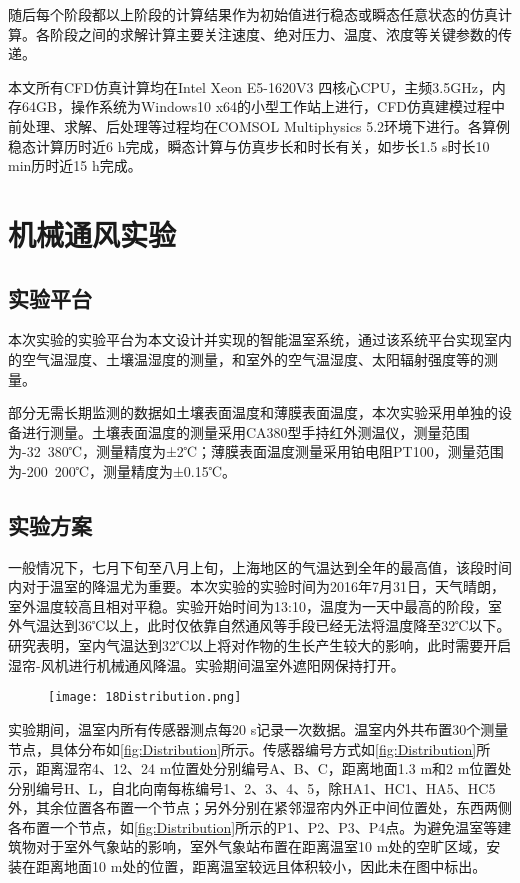 随后每个阶段都以上阶段的计算结果作为初始值进行稳态或瞬态任意状态的仿真计算。各阶段之间的求解计算主要关注速度、绝对压力、温度、浓度等关键参数的传递。

本文所有CFD仿真计算均在Intel Xeon E5-1620V3 四核心CPU，主频3.5GHz，内存64GB，操作系统为Windows10 x64的小型工作站上进行，CFD仿真建模过程中前处理、求解、后处理等过程均在COMSOL Multiphysics 5.2环境下进行。各算例稳态计算历时近6 h完成，瞬态计算与仿真步长和时长有关，如步长1.5 s时长10 min历时近15 h完成。

\section{机械通风实验}
	\subsection{实验平台}
	本次实验的实验平台为本文设计并实现的智能温室系统，通过该系统平台实现室内的空气温湿度、土壤温湿度的测量，和室外的空气温湿度、太阳辐射强度等的测量。
	
部分无需长期监测的数据如土壤表面温度和薄膜表面温度，本次实验采用单独的设备进行测量。土壤表面温度的测量采用CA380型手持红外测温仪，测量范围为-32~380℃，测量精度为±2℃；薄膜表面温度测量采用铂电阻PT100，测量范围为-200~200℃，测量精度为±0.15℃。

	\subsection{实验方案}
	一般情况下，七月下旬至八月上旬，上海地区的气温达到全年的最高值，该段时间内对于温室的降温尤为重要。本次实验的实验时间为2016年7月31日，天气晴朗，室外温度较高且相对平稳。实验开始时间为13:10，温度为一天中最高的阶段，室外气温达到36℃以上，此时仅依靠自然通风等手段已经无法将温度降至32℃以下。研究表明，室内气温达到32℃以上将对作物的生长产生较大的影响，此时需要开启湿帘-风机进行机械通风降温。实验期间温室外遮阳网保持打开。
	 	\begin{figure}[!htp]
  			\centering
 			\texttt{[image: 18Distribution.png]}
		\end{figure}
实验期间，温室内所有传感器测点每20 s记录一次数据。温室内外共布置30个测量节点，具体分布如\ref{fig:Distribution}所示。传感器编号方式如\ref{fig:Distribution}所示，距离湿帘4、12、24 m位置处分别编号A、B、C，距离地面1.3 m和2 m位置处分别编号H、L，自北向南每栋编号1、2、3、4、5，除HA1、HC1、HA5、HC5外，其余位置各布置一个节点；另外分别在紧邻湿帘内外正中间位置处，东西两侧各布置一个节点，如\ref{fig:Distribution}所示的P1、P2、P3、P4点。为避免温室等建筑物对于室外气象站的影响，室外气象站布置在距离温室10 m处的空旷区域，安装在距离地面10 m处的位置，距离温室较远且体积较小，因此未在图中标出。

